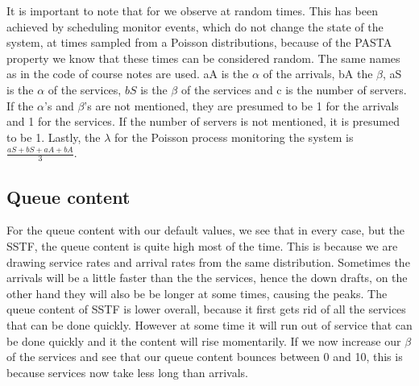 \documentclass[a4paper]{article}
\begin{document}
It is important to note that for we observe at random times. This has been achieved by scheduling monitor events, which do not change the state of the system, at times sampled from a Poisson distributions, because of the PASTA property we know that these times can be considered random. The same names as in the code of course notes are used. aA is the $\alpha$ of the arrivals, bA the $\beta$, aS is the $\alpha$ of the services, $bS$ is the $\beta$ of the services and c is the number of servers. If the $\alpha$'s and $\beta$'s are not mentioned, they are presumed to be 1 for the arrivals and 1 for the services. If the number of servers is not mentioned, it is presumed to be 1. Lastly, the $\lambda$ for the Poisson process monitoring the system is $\frac{aS + bS + aA + bA}{3}$.

\subsection{Queue content}
For the queue content with our default values, we see that in every case, but the SSTF, the queue content is quite high most of the time. This is because we are drawing service rates and arrival rates from the same distribution. Sometimes the arrivals will be a little faster than the the services, hence the down drafts, on the other hand they will also be be longer at some times, causing the peaks. The queue content of SSTF is lower overall, because it first gets rid of all the services that can be done quickly. However at some time it will run out of service that can be done quickly and it the content will rise momentarily. If we now increase our $\beta$ of the services and see that our queue content bounces between 0 and 10, this is because services now take less long than arrivals.
\end{document}
